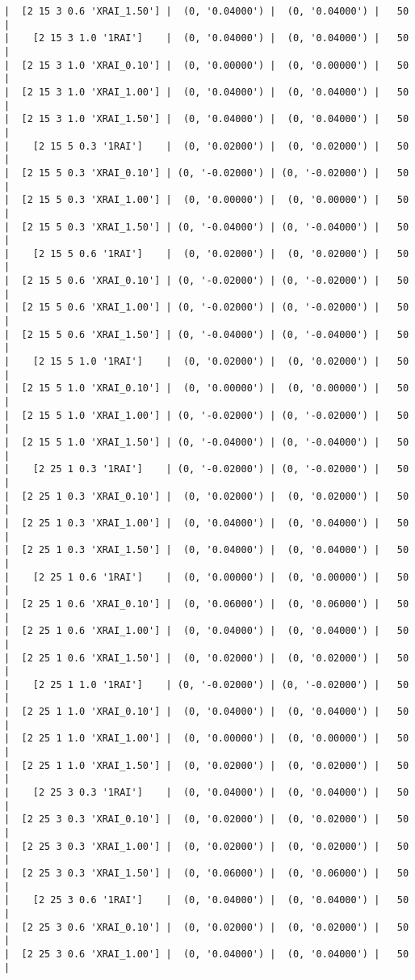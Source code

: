 \documentclass{article}
\begin{document}
\begin{verbatim}
|  [2 15 3 0.6 'XRAI_1.50'] |  (0, '0.04000') |  (0, '0.04000') |   50  |
|    [2 15 3 1.0 '1RAI']    |  (0, '0.04000') |  (0, '0.04000') |   50  |
|  [2 15 3 1.0 'XRAI_0.10'] |  (0, '0.00000') |  (0, '0.00000') |   50  |
|  [2 15 3 1.0 'XRAI_1.00'] |  (0, '0.04000') |  (0, '0.04000') |   50  |
|  [2 15 3 1.0 'XRAI_1.50'] |  (0, '0.04000') |  (0, '0.04000') |   50  |
|    [2 15 5 0.3 '1RAI']    |  (0, '0.02000') |  (0, '0.02000') |   50  |
|  [2 15 5 0.3 'XRAI_0.10'] | (0, '-0.02000') | (0, '-0.02000') |   50  |
|  [2 15 5 0.3 'XRAI_1.00'] |  (0, '0.00000') |  (0, '0.00000') |   50  |
|  [2 15 5 0.3 'XRAI_1.50'] | (0, '-0.04000') | (0, '-0.04000') |   50  |
|    [2 15 5 0.6 '1RAI']    |  (0, '0.02000') |  (0, '0.02000') |   50  |
|  [2 15 5 0.6 'XRAI_0.10'] | (0, '-0.02000') | (0, '-0.02000') |   50  |
|  [2 15 5 0.6 'XRAI_1.00'] | (0, '-0.02000') | (0, '-0.02000') |   50  |
|  [2 15 5 0.6 'XRAI_1.50'] | (0, '-0.04000') | (0, '-0.04000') |   50  |
|    [2 15 5 1.0 '1RAI']    |  (0, '0.02000') |  (0, '0.02000') |   50  |
|  [2 15 5 1.0 'XRAI_0.10'] |  (0, '0.00000') |  (0, '0.00000') |   50  |
|  [2 15 5 1.0 'XRAI_1.00'] | (0, '-0.02000') | (0, '-0.02000') |   50  |
|  [2 15 5 1.0 'XRAI_1.50'] | (0, '-0.04000') | (0, '-0.04000') |   50  |
|    [2 25 1 0.3 '1RAI']    | (0, '-0.02000') | (0, '-0.02000') |   50  |
|  [2 25 1 0.3 'XRAI_0.10'] |  (0, '0.02000') |  (0, '0.02000') |   50  |
|  [2 25 1 0.3 'XRAI_1.00'] |  (0, '0.04000') |  (0, '0.04000') |   50  |
|  [2 25 1 0.3 'XRAI_1.50'] |  (0, '0.04000') |  (0, '0.04000') |   50  |
|    [2 25 1 0.6 '1RAI']    |  (0, '0.00000') |  (0, '0.00000') |   50  |
|  [2 25 1 0.6 'XRAI_0.10'] |  (0, '0.06000') |  (0, '0.06000') |   50  |
|  [2 25 1 0.6 'XRAI_1.00'] |  (0, '0.04000') |  (0, '0.04000') |   50  |
|  [2 25 1 0.6 'XRAI_1.50'] |  (0, '0.02000') |  (0, '0.02000') |   50  |
|    [2 25 1 1.0 '1RAI']    | (0, '-0.02000') | (0, '-0.02000') |   50  |
|  [2 25 1 1.0 'XRAI_0.10'] |  (0, '0.04000') |  (0, '0.04000') |   50  |
|  [2 25 1 1.0 'XRAI_1.00'] |  (0, '0.00000') |  (0, '0.00000') |   50  |
|  [2 25 1 1.0 'XRAI_1.50'] |  (0, '0.02000') |  (0, '0.02000') |   50  |
|    [2 25 3 0.3 '1RAI']    |  (0, '0.04000') |  (0, '0.04000') |   50  |
|  [2 25 3 0.3 'XRAI_0.10'] |  (0, '0.02000') |  (0, '0.02000') |   50  |
|  [2 25 3 0.3 'XRAI_1.00'] |  (0, '0.02000') |  (0, '0.02000') |   50  |
|  [2 25 3 0.3 'XRAI_1.50'] |  (0, '0.06000') |  (0, '0.06000') |   50  |
|    [2 25 3 0.6 '1RAI']    |  (0, '0.04000') |  (0, '0.04000') |   50  |
|  [2 25 3 0.6 'XRAI_0.10'] |  (0, '0.02000') |  (0, '0.02000') |   50  |
|  [2 25 3 0.6 'XRAI_1.00'] |  (0, '0.04000') |  (0, '0.04000') |   50  |

\end{verbatim}
\end{document}
